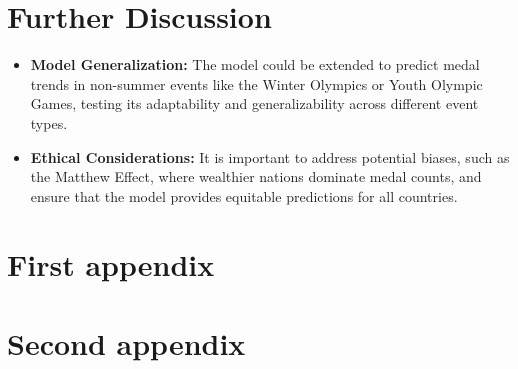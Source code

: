 \documentclass{mcmthesis}
\begin{document}
	
\section{Further Discussion}

\begin{itemize}[leftmargin=0.15in, labelsep=0.1in, itemsep=10pt, parsep=5pt]
	\item \textbf{Model Generalization:} The model could be extended to predict medal trends in non-summer events like the Winter Olympics or Youth Olympic Games, testing its adaptability and generalizability across different event types.
	\item \textbf{Ethical Considerations:} It is important to address potential biases, such as the Matthew Effect, where wealthier nations dominate medal counts, and ensure that the model provides equitable predictions for all countries.
\end{itemize}

	
	
	
%	
		
%		
%		
%		
%		
	
	
	
	
	
	
	
	
	
	
	\newpage
	\printbibliography
	
	
	
	
	\begin{appendices}
		\section{First appendix}
		\section{Second appendix}
	\end{appendices}
	
\end{document}
